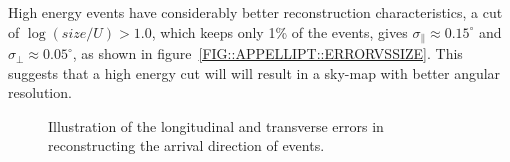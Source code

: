 High energy events have considerably better reconstruction
characteristics, a cut of $\log(size/U)>1.0$, which keeps only 1\% of
the events, gives $\sigma_\parallel\approx0.15^\circ$ and
$\sigma_\perp\approx0.05^\circ$, as shown in
figure~\ref{FIG::APPELLIPT::ERRORVSSIZE}. This suggests that a high
energy cut will will result in a sky-map with better angular
resolution.

\begin{figure}[t]
\centerline{}
\caption{\label{FIG::APPELLIPT::RECONSTRUCTIONERRORS} Illustration of the
longitudinal and transverse errors in reconstructing the arrival direction
of \Gray events.}
\end{figure}

